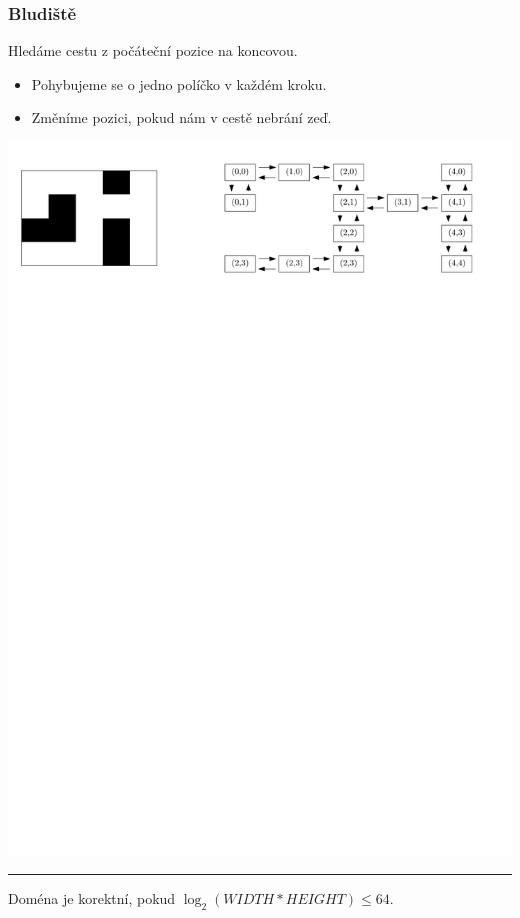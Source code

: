 \documentclass[usenames,dvipsnames,9pt]{beamer}
\begin{document}
\begin{frame}
  \frametitle{Bludiště}
  
  Hledáme cestu z počáteční pozice na koncovou.
  
  \begin{itemize}
  \item Pohybujeme se o jedno políčko v každém kroku.
  \item Změníme pozici, pokud nám v cestě nebrání zeď.
  \end{itemize}
  
  \vspace{1em}

\begin{center}
\includegraphics[width=0.9\linewidth]{figs/maze.pdf}
\end{center}

\vspace{1em}\hrule\vspace{1em}

\faWarning\hspace{3pt} Doména je korektní, pokud $\log_2(WIDTH*HEIGHT) \leq 64$.
\end{frame}
\end{document}
